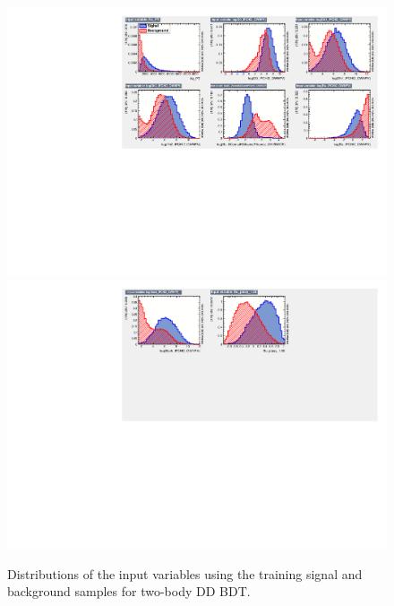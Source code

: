\begin{figure}
\centering
\includegraphics[width=\linewidth]{figures/selection/inputvariables_KPi_DD_run1_1.pdf}
\includegraphics[trim = 0mm 50mm 0mm 0mm, clip,width=\linewidth]{figures/selection/inputvariables_KPi_DD_run1_2.pdf}
\caption{Distributions of the input variables using the training signal and background samples for two-body DD BDT.}
\label{BDTinputdist2bodyDD}
\end{figure}

%

